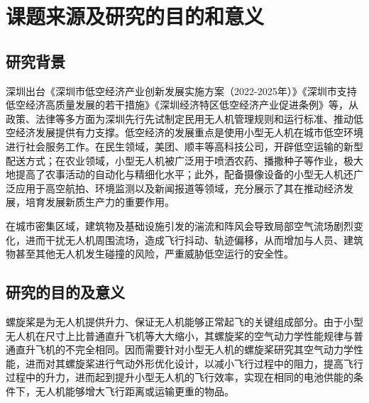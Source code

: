 \section{课题来源及研究的目的和意义}\label{Sec: purpose and background}
\vspace{0.8em}

\vspace{0.8em}
\subsection{研究背景}\label{background}
\vspace{0.8em}



深圳出台《深圳市低空经济产业创新发展实施方案（2022-2025年）》《深圳市支持低空经济高质量发展的若干措施》《深圳经济特区低空经济产业促进条例》等，从政策、法律等多方面为深圳先行先试制定民用无人机管理规则和运行标准、推动低空经济发展提供有力支撑。低空经济的发展重点是使用小型无人机在城市低空环境进行社会服务工作。在民生领域，美团、顺丰等高科技公司，开辟低空运输的新型配送方式；在农业领域，小型无人机被广泛用于喷洒农药、播撒种子等作业，极大地提高了农事活动的自动化与精细化水平；此外，配备摄像设备的小型无人机还广泛应用于高空航拍、环境监测以及新闻报道等领域，充分展示了其在推动经济发展，培育发展新质生产力的重要作用。

在城市密集区域，建筑物及基础设施引发的湍流和阵风会导致局部空气流场剧烈变化，进而干扰无人机周围流场，造成飞行抖动、轨迹偏移，从而增加与人员、建筑物甚至其他无人机发生碰撞的风险，严重威胁低空运行的安全性。








\vspace{0.8em}
\subsection{研究的目的及意义}\label{purpose}
\vspace{0.8em}

螺旋桨是为无人机提供升力、保证无人机能够正常起飞的关键组成部分。由于小型无人机在尺寸上比普通直升飞机等大大缩小，其螺旋桨的空气动力学性能规律与普通直升飞机的不完全相同。因而需要针对小型无人机的螺旋桨研究其空气动力学性能，进而对其螺旋桨进行气动外形优化设计，以减小飞行过程中的阻力，提高飞行过程中的升力，进而起到提升小型无人机的飞行效率，实现在相同的电池供能的条件下，无人机能够增大飞行距离或运输更重的物品。%

